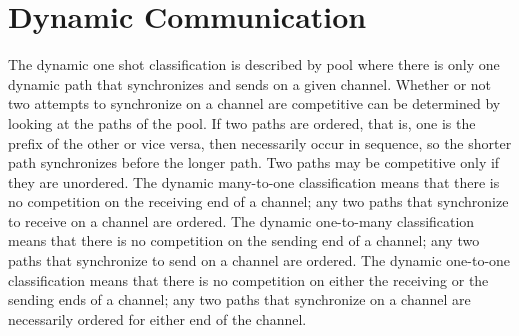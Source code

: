 \documentclass{article}
\begin{document}
\section{Dynamic Communication}

The dynamic one shot classification is described by pool where there is only one dynamic path
that synchronizes and sends on a given channel. Whether or not two attempts to
synchronize on a channel are competitive can be determined by
looking at the paths of the pool. If two paths are ordered, that is, one is the
prefix of the other or vice versa, then necessarily
occur in sequence, so the shorter path synchronizes before the longer path. Two paths may
be competitive only if they are unordered. The dynamic many-to-one classification means that
there is no competition on the receiving end of a channel; any two paths that synchronize to
receive on a channel are ordered. The dynamic one-to-many classification means that there
is no competition on the sending end of a channel; any two paths that synchronize to
send on a channel are ordered. The dynamic one-to-one classification means that there is no
competition on either the receiving or the sending ends of a channel; any two paths that
synchronize on a channel are necessarily ordered for either end of the channel. 
\end{document}
